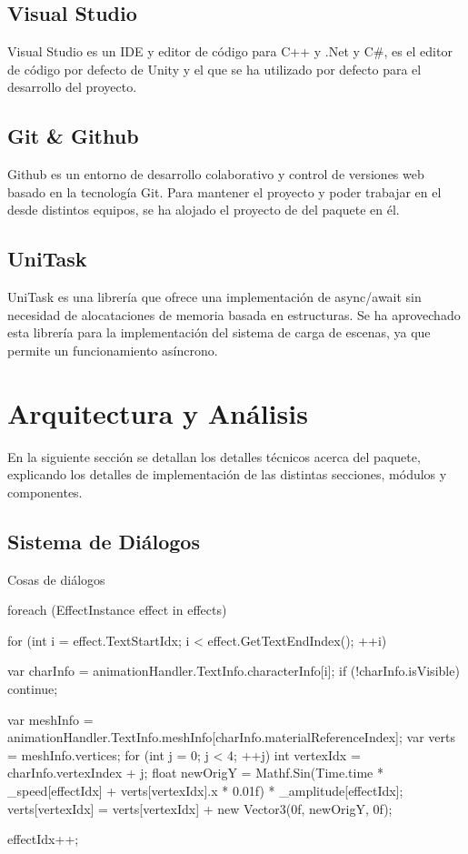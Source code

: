 \subsection{Visual Studio}

Visual Studio\cite{visualstudio} es un IDE y editor de código para C++ y .Net y C\#, es el editor de código por defecto de Unity y el que se ha utilizado por defecto para el desarrollo del proyecto. 

\subsection{Git \& Github}

Github\cite{github} es un entorno de desarrollo colaborativo y control de versiones web basado en la tecnología Git. Para mantener el proyecto y poder trabajar en el desde distintos equipos, se ha alojado el proyecto de del paquete\cite{Repo} en él.

\subsection{UniTask}

UniTask\cite{UniTask} es una librería que ofrece una implementación de async/await sin necesidad de alocataciones de memoria basada en estructuras. Se ha aprovechado esta librería para la implementación del sistema de carga de escenas, ya que permite un funcionamiento asíncrono.

\section{Arquitectura y Análisis}
En la siguiente sección se detallan los detalles técnicos acerca del paquete, explicando los detalles de implementación de las distintas secciones, módulos y componentes.

\subsection{Sistema de Diálogos}
Cosas de diálogos

\begin{mypython}[caption={Ejemplo de código utilizado para definir la animación de 'Wobble' en el texto.},label={alg:wobbleAnimation}]
    foreach (EffectInstance effect in effects) 
    {
        for (int i = effect.TextStartIdx; i < effect.GetTextEndIndex(); ++i)
        {
            var charInfo = animationHandler.TextInfo.characterInfo[i];
            if (!charInfo.isVisible)
            {
                continue;
            }
            
            var meshInfo = animationHandler.TextInfo.meshInfo[charInfo.materialReferenceIndex];
            var verts = meshInfo.vertices;
            for (int j = 0; j < 4; ++j)
            {
                int vertexIdx = charInfo.vertexIndex + j;
                float newOrigY = Mathf.Sin(Time.time * _speed[effectIdx] + verts[vertexIdx].x * 0.01f) * _amplitude[effectIdx];
                verts[vertexIdx] = verts[vertexIdx] + new Vector3(0f, newOrigY, 0f);
            }
        }
        effectIdx++;
    }
\end{mypython}

